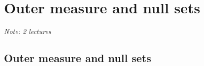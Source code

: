 \documentclass[12pt]{book}
\newcommand{\R}{{\mathbb{R}}}
\newcommand{\Q}{{\mathbb{Q}}}
\newcommand{\myindex}[1]{#1\index{#1}}
\newcommand{\sectionnotes}[1]{\noindent \emph{Note: #1} \medskip \par}
\newcommand{\sectionnewpage}{\clearpage}
\theoremstyle{plain}
\theoremstyle{remark}
\theoremstyle{definition}
\newtheorem{defn}[thm]{Definition}
\theoremstyle{exercise}
\theoremstyle{example}
\newtheorem{example}[thm]{Example}
\begin{document}

\sectionnewpage
\section{Outer measure and null sets}
\label{sec:outermeasure}

\sectionnotes{2 lectures}

%
%
%
%
%
%
%
%

\subsection{Outer measure and null sets}

%
%
%
\end{document}
